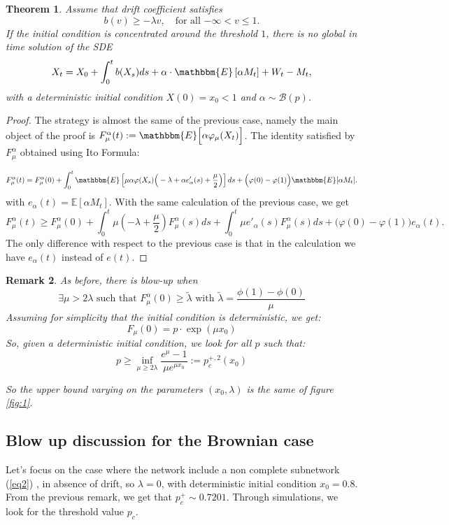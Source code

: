 \documentclass[11pt, a4paper]{article}
\newtheorem{theorem}{Theorem}
\newtheorem{remark}[theorem]{Remark}
\begin{document}
\begin{theorem}
Assume that drift coefficient satisfies
\[b(v) \geq -\lambda v, \quad \text{for all $-\infty<v\leq1$.}\]
If the initial condition is concentrated around the threshold $1$, there is no global in time solution of the SDE
\begin{equation} \label{limit1} X_t = X_0 + \int_0^t b(X_s) ds + \alpha  \cdot \mathbbm{E} \left[ \alpha M_t \right] + W_t - M_t, \end{equation}
with a deterministic initial condition $X(0) = x_0 < 1$ and $\alpha\sim\mathcal{B}(p)$.
\end{theorem}
\begin{proof}
The strategy is almost the same of the previous case, namely the main object of the proof is 
$F^\alpha_\mu(t) := \mathbbm{E} \Big[ \alpha \varphi_\mu (X_t) \Big]$. The identity satisfied by $F^\alpha_\mu$ obtained using Ito Formula:

\[ F^\alpha_\mu(t) = F^\alpha_\mu(0) + \int_0^t \mathbbm{E} \left[ \mu \alpha \varphi(X_s) \Big( -\lambda + \alpha e_\alpha'(s) + \frac{\mu}{2} \Big) \right] ds + \Big( \varphi(0) - \varphi(1) \Big) \mathbbm{E}[\alpha M_t]. \]
with $e_\alpha(t)=\mathbb{E}[\alpha M_t]$. With the same calculation of the previous case, we get
\begin{equation*} 
\label{starting} F^\alpha_\mu(t) \geq F^\alpha_\mu(0) + \int_0^t \mu \left( - \lambda + \frac{\mu}{2} \right) F^\alpha_\mu(s) ds + \int_0^t \mu e'_\alpha(s) F^\alpha_\mu(s) ds + \Big( \varphi(0) - \varphi(1) \Big) e_\alpha(t).
 \end{equation*}
 The only difference with respect to the previous case is that in the calculation we have $e_\alpha(t)$ instead of $e(t)$.
\end{proof}
\begin{remark}
As before, there is blow-up when
\[\exists \mu>2\lambda\text{ such that }F^\alpha_\mu(0)\geq \tilde{\lambda}\text{ with }\tilde{\lambda}=\frac{\phi(1)-\phi(0)}{\mu } \]
Assuming for simplicity that the initial condition is deterministic, we get:
\[F_\mu(0)=p\cdot\exp(\mu x_0)\]
So, given a deterministic initial condition, we look for all $p$ such that:
\[p\geq \inf_{\mu\geq 2\lambda}\frac{e^\mu-1}{\mu e^{\mu x_0}}:=p^{+,2}_c(x_0)\]

So the upper bound varying on the parameters $(x_0,\lambda)$ is the same of figure \ref{fig:1}.
\end{remark}

\subsection{Blow up discussion for the Brownian case}
Let's focus on the case where the network include a non complete subnetwork  (\ref{eq2}) , in absence of drift, so $\lambda=0$, with deterministic initial condition $x_0=0.8$. From the previous remark, we get that $p^+_c\sim 0.7201$. Through simulations, we look for the threshold value $p_c$.\\
\end{document}
